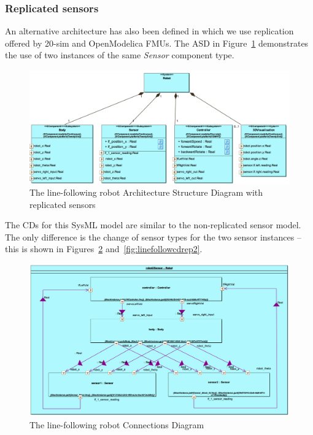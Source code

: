 \subsubsection*{Replicated sensors}

An alternative architecture has also been defined in which we use replication offered by 20-sim and OpenModelica FMUs. The ASD in Figure~\ref{fig:linefollowasdrep} demonstrates the use of two instances of the same \emph{Sensor} component type.

\begin{figure}[htb!]
\begin{center}
     \includegraphics[width=0.8\linewidth]{linefollower/r2g2p_asd_rep.png} 
\caption{The line-following robot Architecture Structure Diagram with replicated sensors}
\label{fig:linefollowasdrep}
\end{center}
\end{figure}

The CDs for this SysML model are similar to the non-replicated sensor model. The only difference is the change of sensor types for the two sensor instances -- this is shown in Figures~\ref{fig:linefollowcdrep1} and~\ref{fig:linefollowcdrep2}.

\begin{figure}[htb!]
\begin{center}
     \includegraphics[width=0.9\linewidth]{linefollower/r2g2p_cd} 
\caption{The line-following robot Connections Diagram}
\label{fig:linefollowcdrep1}
\end{center}
\end{figure}

